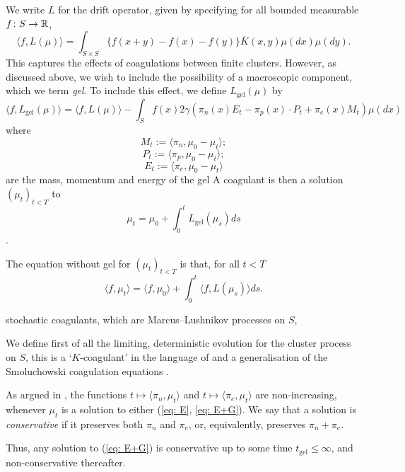  We write $L$ for the drift operator, given by specifying for all bounded measurable $f\colon S \rightarrow \mathbb{R}$, \begin{equation} \label{eq: drift wo gel}
    \langle f,L(\mu)\rangle=\int_{S\times S}\{f(x+y)-f(x)-f(y)\}\overline{K}(x,y)\mu(dx)\mu(dy).
\end{equation}
This captures the effects of coagulations between finite clusters. However, as discussed above, we wish to include the possibility of a macroscopic component, which we term \emph{gel}. To include this effect, we define $L_\text{gel}(\mu)$ by \begin{equation}
    \langle f, L_\text{gel}(\mu)\rangle = \langle f, L(\mu)\rangle -\int_S f(x) 2\gamma\left(\pi_n(x)E_t-\pi_p(x)\cdot P_t + \pi_e(x)M_t\right) \mu(dx)
\end{equation} where \begin{equation}
    M_t:=\langle \pi_n, \mu_0-\mu_t\rangle;
\end{equation}
\begin{equation}
    P_t:=\langle \pi_p, \mu_0-\mu_t\rangle;
\end{equation}\begin{equation}
    E_t:=\langle \pi_e, \mu_0-\mu_t\rangle
\end{equation} are the mass, momentum and energy of the gel
A coagulant is then a solution $(\mu_t)_{t<T}$ to \begin{equation} \tag{E+G} \label{eq: E+G}
    \mu_t= \mu_0 + \int_0^t L_\text{gel}(\mu_s)ds
\end{equation}.


The equation without gel for $(\mu_t)_{t<T}$ is that, for all $t<T$
\begin{equation}
    \tag{E-G}\label{eq: E} \langle f, \mu_t\rangle =\langle f, \mu_0 \rangle +\int_0^t \langle f, L(\mu_s)\rangle ds. 
\end{equation}

stochastic coagulants, which are Marcus--Lushnikov processes on $S$, 


We define first of all the limiting, deterministic evolution for the cluster process on $S$, this is a `$K$-coagulant' in the language of \cite{N00} and a generalisation of the Smoluchowski coagulation equations \cite{vS16}.


\begin{definition} As argued in \cite{N00}, the functions $t\mapsto \langle \pi_n, \mu_t\rangle$ and $t\mapsto \langle \pi_e, \mu_t\rangle$ are non-increasing, whenever $\mu_t$ is a solution to either (\ref{eq: E}, \ref{eq: E+G}). We say that a solution is \emph{conservative} if it preserves both $\pi_n$ and $\pi_e$, or, equivalently, preserves $\pi_n+\pi_e$. \end{definition}
 Thus, any solution to (\ref{eq: E+G}) is conservative up to some time $t_\text{gel}\leq \infty$, and non-conservative thereafter.
 
